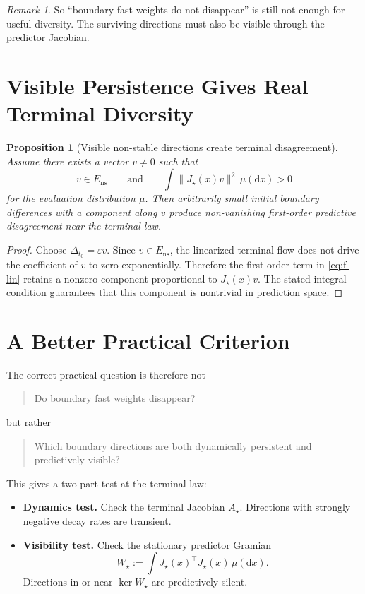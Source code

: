 \documentclass[11pt]{article}
\newtheorem{proposition}[theorem]{Proposition}
\theoremstyle{remark}
\newtheorem{remark}[theorem]{Remark}
\begin{document}
\begin{remark}
So ``boundary fast weights do not disappear'' is still not enough for useful diversity. The surviving directions must also be visible through the predictor Jacobian.
\end{remark}

\section{Visible Persistence Gives Real Terminal Diversity}

\begin{proposition}[Visible non-stable directions create terminal disagreement]
\label{prop:visible-persistence}
Assume there exists a vector $v\neq 0$ such that
\[
v\in E_{\mathrm{ns}}
\qquad\text{and}\qquad
\int \|J_\star(x)v\|^2\,\mu(\mathrm dx) > 0
\]
for the evaluation distribution $\mu$.
Then arbitrarily small initial boundary differences with a component along $v$ produce non-vanishing first-order predictive disagreement near the terminal law.
\end{proposition}

\begin{proof}
Choose $\Delta_{t_0}=\varepsilon v$. Since $v\in E_{\mathrm{ns}}$, the linearized terminal flow does not drive the coefficient of $v$ to zero exponentially. Therefore the first-order term in \eqref{eq:f-lin} retains a nonzero component proportional to $J_\star(x)v$. The stated integral condition guarantees that this component is nontrivial in prediction space.
\end{proof}

\section{A Better Practical Criterion}

The correct practical question is therefore not
\begin{quote}
Do boundary fast weights disappear?
\end{quote}
but rather
\begin{quote}
Which boundary directions are both dynamically persistent and predictively visible?
\end{quote}

This gives a two-part test at the terminal law:
\begin{itemize}
\item \textbf{Dynamics test.}
Check the terminal Jacobian $A_\star$. Directions with strongly negative decay rates are transient.
\item \textbf{Visibility test.}
Check the stationary predictor Gramian
\[
W_\star
:=
\int J_\star(x)^\top J_\star(x)\,\mu(\mathrm dx).
\]
Directions in or near $\ker W_\star$ are predictively silent.
\end{itemize}
\end{document}
